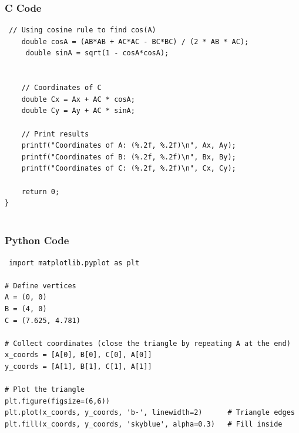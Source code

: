 \documentclass{beamer}
\begin{document}
\begin{frame}[fragile]
    \frametitle{C Code}
    \begin{lstlisting}
 // Using cosine rule to find cos(A)
    double cosA = (AB*AB + AC*AC - BC*BC) / (2 * AB * AC);
     double sinA = sqrt(1 - cosA*cosA);
    

    // Coordinates of C
    double Cx = Ax + AC * cosA;
    double Cy = Ay + AC * sinA;

    // Print results
    printf("Coordinates of A: (%.2f, %.2f)\n", Ax, Ay);
    printf("Coordinates of B: (%.2f, %.2f)\n", Bx, By);
    printf("Coordinates of C: (%.2f, %.2f)\n", Cx, Cy);

    return 0;
}


    \end{lstlisting}
\end{frame}

 

\begin{frame}[fragile]
    \frametitle{Python Code}
    \begin{lstlisting}
 import matplotlib.pyplot as plt

# Define vertices
A = (0, 0)
B = (4, 0)
C = (7.625, 4.781)

# Collect coordinates (close the triangle by repeating A at the end)
x_coords = [A[0], B[0], C[0], A[0]]
y_coords = [A[1], B[1], C[1], A[1]]

# Plot the triangle
plt.figure(figsize=(6,6))
plt.plot(x_coords, y_coords, 'b-', linewidth=2)      # Triangle edges
plt.fill(x_coords, y_coords, 'skyblue', alpha=0.3)   # Fill inside


    \end{lstlisting}
\end{frame}
\end{document}
